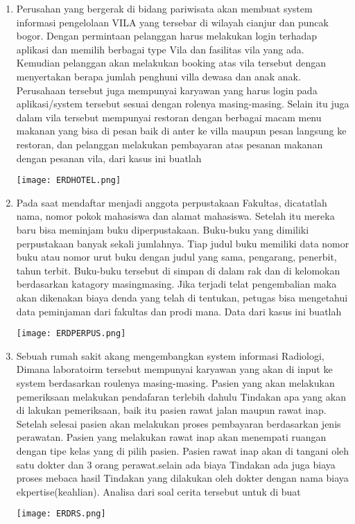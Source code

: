 \documentclass[12pt,a4paper]{article}
\begin{document}
\begin{enumerate}
      \item Perusahan yang bergerak di bidang pariwisata akan membuat system informasi
        pengelolaan VILA yang tersebar di wilayah cianjur dan puncak bogor. Dengan permintaan
        pelanggan harus melakukan login terhadap aplikasi dan memilih berbagai type Vila dan
        fasilitas vila yang ada. Kemudian pelanggan akan melakukan booking atas vila tersebut
        dengan menyertakan berapa jumlah penghuni villa dewasa dan anak anak. Perusahaan
        tersebut juga mempunyai karyawan yang harus login pada aplikasi/system tersebut sesuai
        dengan rolenya masing-masing. Selain itu juga dalam vila tersebut mempunyai restoran
        dengan berbagai macam menu makanan yang bisa di pesan baik di anter ke villa maupun
        pesan langsung ke restoran, dan pelanggan melakukan pembayaran atas pesanan makanan
        dengan pesanan vila, dari kasus ini buatlah
        \begin{center}
          \texttt{[image: ERDHOTEL.png]}
        \end{center}

      \item Pada saat mendaftar menjadi anggota perpustakaan Fakultas, dicatatlah nama, nomor pokok
        mahasiswa dan alamat mahasiswa. Setelah itu mereka baru bisa meminjam buku diperpustakaan.
        Buku-buku yang dimiliki perpustakaan banyak sekali jumlahnya. Tiap judul buku memiliki data
        nomor buku atau nomor urut buku dengan judul yang sama, pengarang, penerbit, tahun terbit.
        Buku-buku tersebut di simpan di dalam rak dan di kelomokan berdasarkan katagory masingmasing. Jika terjadi telat pengembalian maka akan dikenakan biaya denda yang telah di tentukan,
        petugas bisa mengetahui data peminjaman dari fakultas dan prodi mana. Data dari kasus ini
        buatlah
        \begin{center}
          \texttt{[image: ERDPERPUS.png]}
        \end{center}

      \item Sebuah rumah sakit akang mengembangkan system informasi Radiologi, Dimana
        laboratoirm tersebut mempunyai karyawan yang akan di input ke system berdasarkan
        roulenya masing-masing. Pasien yang akan melakukan pemeriksaan melakukan
        pendafaran terlebih dahulu Tindakan apa yang akan di lakukan pemeriksaan, baik itu
        pasien rawat jalan maupun rawat inap. Setelah selesai pasien akan melakukan proses
        pembayaran berdasarkan jenis perawatan. Pasien yang melakukan rawat inap akan
        menempati ruangan dengan tipe kelas yang di pilih pasien. Pasien rawat inap akan di
        tangani oleh satu dokter dan 3 orang perawat.selain ada biaya Tindakan ada juga biaya
        proses mebaca hasil Tindakan yang dilakukan oleh dokter dengan nama biaya
        ekpertise(keahlian). Analisa dari soal cerita tersebut untuk di buat
        \begin{center}
          \texttt{[image: ERDRS.png]}
        \end{center}


\end{enumerate}
\end{document}
